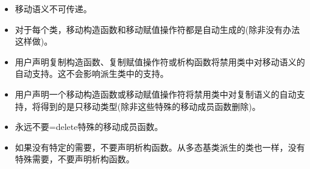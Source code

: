 \begin{itemize}
	\item 移动语义不可传递。
	\item 对于每个类，移动构造函数和移动赋值操作符都是自动生成的(除非没有办法这样做)。
	\item 用户声明复制构造函数、复制赋值操作符或析构函数将禁用类中对移动语义的自动支持。这不会影响派生类中的支持。
	\item 用户声明一个移动构造函数或移动赋值操作符将禁用类中对复制语义的自动支持，将得到的是只移动类型(除非这些特殊的移动成员函数删除)。
	\item 永远不要=delete特殊的移动成员函数。
	\item 如果没有特定的需要，不要声明析构函数。从多态基类派生的类也一样，没有特殊需要，不要声明析构函数。
\end{itemize}


